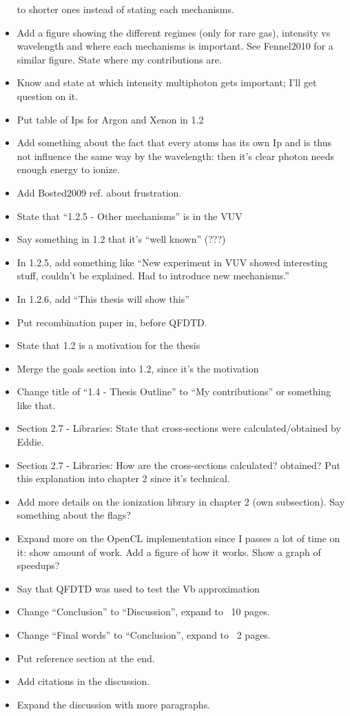 \begin{itemize}
to shorter ones instead of stating each mechanisms.
\item Add a figure showing the different regimes (only for rare gas), intensity
vs wavelength and where each mechanisms is important. See Fennel2010 for a
similar figure. State where my contributions are.
\item Know and state at which intensity multiphoton gets important; I'll get
question on it.
\item Put table of Ips for Argon and Xenon in 1.2
\item Add something about the fact that every atoms has its own Ip and is thus
not influence the same way by the wavelength: then it's clear photon needs
enough energy to ionize.
\item Add Bosted2009 ref. about frustration.
\item State that ``1.2.5 - Other mechanisms'' is in the VUV
\item Say something in 1.2 that it's ``well known'' (???)
\item In 1.2.5, add something like ``New experiment in VUV showed interesting
stuff, couldn't be explained. Had to introduce new mechanisms.''
\item In 1.2.6, add ``This thesis will show this''
\item Put recombination paper in, before QFDTD.
\item State that 1.2 is a motivation for the thesis
\item Merge the goals section into 1.2, since it's the motivation
\item Change title of ``1.4 - Thesis Outline'' to ``My contributions'' or
something like that.
\item Section 2.7 - Libraries: State that cross-sections were calculated/obtained
by Eddie.
\item Section 2.7 - Libraries: How are the cross-sections calculated? obtained?
Put this explanation into chapter 2 since it's technical.
\item Add more details on the ionization library in chapter 2 (own subsection).
Say something about the flags?
\item Expand more on the OpenCL implementation since I passes a lot of time on
it: show amount of work. Add a figure of how it works. Show a graph of speedups?
\item Say that QFDTD was used to test the Vb approximation
\item Change ``Conclusion'' to ``Discussion'', expand to ~10 pages.
\item Change ``Final words'' to ``Conclusion'', expand to ~2 pages.
\item Put reference section at the end.
\item Add citations in the discussion.
\item Expand the discussion with more paragraphs.
\end{itemize}

